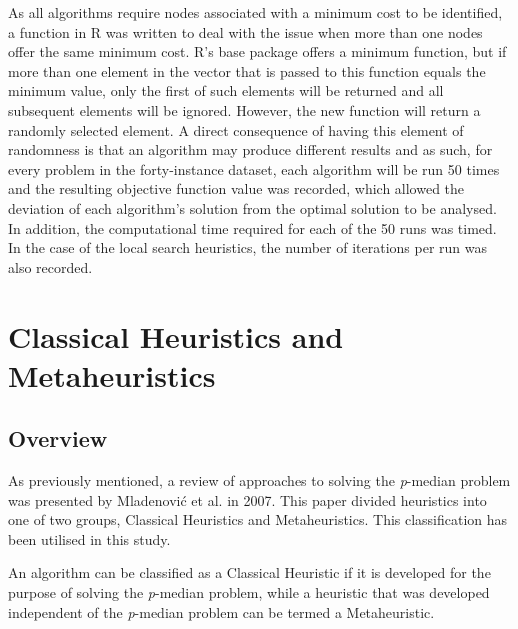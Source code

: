 \documentclass[11pt]{article}
\begin{document}
	As all algorithms require nodes associated with a minimum cost to be identified, a function in R  was written to deal with the issue when more than one nodes offer the same minimum cost.  R's base package offers a minimum function, but if more than one element in the vector that is passed to this function equals the minimum value, only the first of such elements will be returned and all subsequent elements will be ignored.  However, the new function will return a randomly selected element.  A direct consequence of having this element of randomness is that an algorithm may produce different results and as such, for every problem in the forty-instance dataset, each algorithm will be run 50 times and the resulting objective function value was recorded, which allowed the deviation of each algorithm's solution from the optimal solution to be analysed.  In addition, the computational time required for each of the 50 runs was timed.  In the case of the local search heuristics, the number of iterations per run was also recorded.
	
		
	\section{Classical Heuristics and Metaheuristics} \label{classical.meta.heuristics}
	\subsection{Overview} \label{heuristics.overview}
	As previously mentioned, a review of approaches to solving the \textit{p}-median problem was presented by Mladenovi\'{c} et al. \cite{MLAD07} in 2007.  This paper divided heuristics into one of two groups, Classical Heuristics and Metaheuristics.  This classification has been utilised in this study.
	
	An algorithm can be classified as a Classical Heuristic if it is developed for the purpose of solving the \emph{p}-median problem, while a heuristic that was developed independent of the \emph{p}-median problem can be termed a Metaheuristic.
		
	
\end{document}

